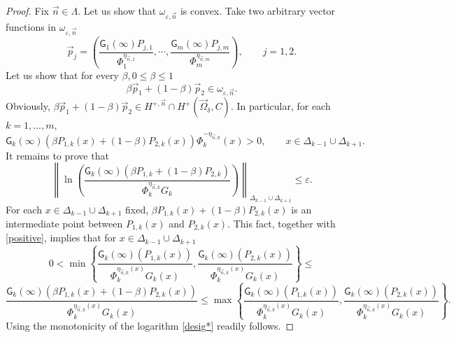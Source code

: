 \documentclass{amsart}
\numberwithin{equation}{section}
\theoremstyle{definition}
\newcommand{\n}{\vec{n}}          %
\begin{document}
\begin{proof}
Fix $\n \in \Lambda$. Let us show that $\omega_{\varepsilon,\n}$ is convex. Take two arbitrary vector functions in $\omega_{\varepsilon,\n}$
\[ \vec{p}_j =  \left(\frac{\mathsf{G}_1(\infty) {P}_{j,1}}{\Phi_1^{\eta_{\n,1}}}, \cdots, \frac{\mathsf{G}_m(\infty) {P}_{j,m}}{\Phi_m^{\eta_{\n,m}}}\right) , \qquad j=1,2.
\]
 Let us show that for every $\beta, 0 \leq \beta \leq 1$
\[ \beta \vec{p}_1 + (1 - \beta) \vec{p}_2  \in \omega_{\varepsilon,\n}.
\]
Obviously, $\beta \vec{p}_1 + (1 - \beta) \vec{p}_2 \in H^{+,\n} \cap H^+(\vec{\Omega}_{\delta}, C)$.   In particular, for each $k = 1,\ldots,m,$
\begin{equation} \label{positive} {\mathsf{G}_k(\infty) (\beta {P}_{1,k}(x)+(1-\beta)P_{2,k}(x))}{\Phi_k^{-\eta_{\n,k}}(x)} > 0, \qquad x \in \Delta_{k-1} \cup \Delta_{k+1}.
\end{equation}
It remains to prove that
\begin{equation} \label{desig*}
\left\| \ln \left( \frac{\mathsf{G}_k(\infty) (\beta {P}_{1,k}+(1-\beta)P_{2,k})}{\Phi_k^{\eta_{\n,k}}G_k} \right)\right\|_{\Delta_{k-1} \cup \Delta_{k+1}} \leq \varepsilon.
\end{equation}
For each $x \in \Delta_{k-1} \cup \Delta_{k+1}$ fixed, $\beta {P}_{1,k}(x)+(1-\beta)P_{2,k}(x)$ is an intermediate
point between ${P}_{1,k}(x)$ and ${P}_{2,k}(x)$. This fact, together with \eqref{positive}, implies that for $x \in \Delta_{k-1} \cup \Delta_{k+1}$
\[ 0 <  \min \left\{ \frac{\mathsf{G}_k(\infty) ({P}_{1,k}(x)) }{\Phi_k^{\eta_{\n,k}(x)}G_k(x)}, \frac{\mathsf{G}_k(\infty) ({P}_{2,k}(x)) }{\Phi_k^{\eta_{\n,k}(x)}G_k(x)} \right\} \leq
\]
\[ \frac{\mathsf{G}_k(\infty) (\beta {P}_{1,k}(x)+(1-\beta)P_{2,k}(x))}{\Phi_k^{\eta_{\n,k}(x)}G_k(x)}  \leq \max \left\{ \frac{\mathsf{G}_k(\infty) ({P}_{1,k}(x)) }{\Phi_k^{\eta_{\n,k}(x)}G_k(x)}, \frac{\mathsf{G}_k(\infty) ({P}_{2,k}(x)) }{\Phi_k^{\eta_{\n,k}(x)}G_k(x)} \right\}.
\]
Using the monotonicity of the logarithm \eqref{desig*} readily follows.


\end{proof}
\end{document}
